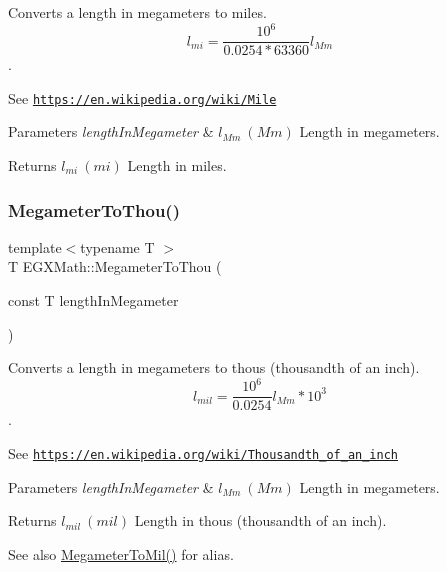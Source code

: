 Converts a length in megameters to miles. \[ l_{mi}=\frac{10^{6}}{0.0254 * 63360} l_{Mm} \]. 

See \href{https://en.wikipedia.org/wiki/Mile}{\tt https\+://en.\+wikipedia.\+org/wiki/\+Mile} 
\begin{DoxyParams}{Parameters}
{\em length\+In\+Megameter} & $ l_{Mm}\ (Mm)$ Length in megameters. \\
\hline
\end{DoxyParams}
\begin{DoxyReturn}{Returns}
$ l_{mi}\ (mi)$ Length in miles. 
\end{DoxyReturn}
\mbox{\label{group___e_g_x_math-_conversions-_length_conversions-_megameter-_imperial_gae791a30b052a322fff88090e90fe32b5}} 
\subsubsection{\texorpdfstring{Megameter\+To\+Thou()}{MegameterToThou()}}
{\footnotesize\ttfamily template$<$typename T $>$ \\
T E\+G\+X\+Math\+::\+Megameter\+To\+Thou (\begin{DoxyParamCaption}\item[{const T}]{length\+In\+Megameter }\end{DoxyParamCaption})}



Converts a length in megameters to thous (thousandth of an inch). \[ l_{mil}= \frac{10^{6}}{0.0254} l_{Mm} * 10^{3} \]. 

See \href{https://en.wikipedia.org/wiki/Thousandth_of_an_inch}{\tt https\+://en.\+wikipedia.\+org/wiki/\+Thousandth\+\_\+of\+\_\+an\+\_\+inch} 
\begin{DoxyParams}{Parameters}
{\em length\+In\+Megameter} & $ l_{Mm}\ (Mm)$ Length in megameters. \\
\hline
\end{DoxyParams}
\begin{DoxyReturn}{Returns}
$ l_{mil}\ (mil)$ Length in thous (thousandth of an inch). 
\end{DoxyReturn}
\begin{DoxySeeAlso}{See also}
\mbox{\hyperlink{group___e_g_x_math-_conversions-_length_conversions-_megameter-_imperial_ga9494edd6659b7f69549d4fe96b9e2f98}{Megameter\+To\+Mil()}} for alias. 
\end{DoxySeeAlso}
\mbox{\label{group___e_g_x_math-_conversions-_length_conversions-_megameter-_imperial_gae8b77cb5d4f8cf566968e18dde870c74}} 
